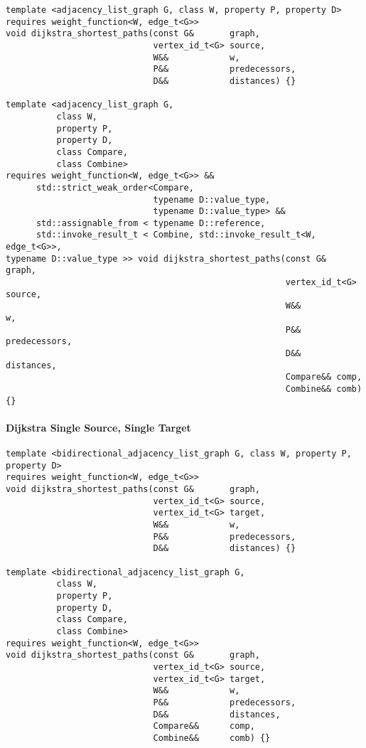 \begin{lstlisting}
template <adjacency_list_graph G, class W, property P, property D>
requires weight_function<W, edge_t<G>>
void dijkstra_shortest_paths(const G&       graph,
                             vertex_id_t<G> source,
                             W&&            w,
                             P&&            predecessors,
                             D&&            distances) {}

template <adjacency_list_graph G,
          class W,
          property P,
          property D,
          class Compare,
          class Combine>
requires weight_function<W, edge_t<G>> &&
      std::strict_weak_order<Compare,
                             typename D::value_type,
                             typename D::value_type> &&
      std::assignable_from < typename D::reference,
      std::invoke_result_t < Combine, std::invoke_result_t<W, edge_t<G>>,
typename D::value_type >> void dijkstra_shortest_paths(const G&       graph,
                                                       vertex_id_t<G> source,
                                                       W&&            w,
                                                       P&&       predecessors,
                                                       D&&       distances,
                                                       Compare&& comp,
                                                       Combine&& comb) {}

\end{lstlisting}

\paragraph{Dijkstra Single Source, Single Target}
\begin{lstlisting}
template <bidirectional_adjacency_list_graph G, class W, property P, property D>
requires weight_function<W, edge_t<G>>
void dijkstra_shortest_paths(const G&       graph,
                             vertex_id_t<G> source,
                             vertex_id_t<G> target,
                             W&&            w,
                             P&&            predecessors,
                             D&&            distances) {}

template <bidirectional_adjacency_list_graph G,
          class W,
          property P,
          property D,
          class Compare,
          class Combine>
requires weight_function<W, edge_t<G>>
void dijkstra_shortest_paths(const G&       graph,
                             vertex_id_t<G> source,
                             vertex_id_t<G> target,
                             W&&            w,
                             P&&            predecessors,
                             D&&            distances,
                             Compare&&      comp,
                             Combine&&      comb) {}


\end{lstlisting}


